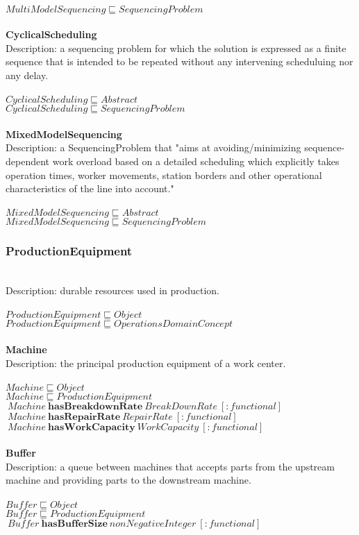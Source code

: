 \\$ MultiModelSequencing \sqsubseteq SequencingProblem$
\\\\   \textbf{CyclicalScheduling}\\Description: a sequencing problem for which the solution is expressed as a finite sequence that is intended to be repeated without any intervening scheduluing nor any delay.\\
\\$ CyclicalScheduling \sqsubseteq Abstract$
\\$ CyclicalScheduling \sqsubseteq SequencingProblem$
\\\\   \textbf{MixedModelSequencing}\\Description: a SequencingProblem that "aims at avoiding/minimizing sequence-dependent work overload based on a detailed scheduling which explicitly takes operation times, worker movements, station borders and other operational characteristics of the line into account." \cite{Boysen2009}\\
\\$ MixedModelSequencing \sqsubseteq Abstract$
\\$ MixedModelSequencing \sqsubseteq SequencingProblem$
\subsubsection{ProductionEquipment}\\
Description: durable resources used in production.\\
\\$ ProductionEquipment \sqsubseteq Object$
\\$ ProductionEquipment \sqsubseteq OperationsDomainConcept$
\\\\   \textbf{Machine}\\Description: the principal production equipment of a work center.\\
\\$ Machine \sqsubseteq Object$
\\$ Machine \sqsubseteq ProductionEquipment$
\\$\: Machine\: \textbf{hasBreakdownRate}\: BreakDownRate\: [:functional]$
\\$\: Machine\: \textbf{hasRepairRate}\: RepairRate\: [:functional]$
\\$\: Machine\: \textbf{hasWorkCapacity}\: WorkCapacity\: [:functional]$
\\\\   \textbf{Buffer}\\Description: a queue between machines that accepts parts from the upstream machine and providing parts to the downstream machine.\\
\\$ Buffer \sqsubseteq Object$
\\$ Buffer \sqsubseteq ProductionEquipment$
\\$\: Buffer\: \textbf{hasBufferSize}\: nonNegativeInteger\: [:functional]$
